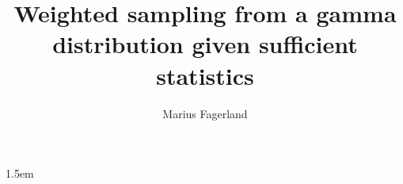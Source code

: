 \documentclass[a4paper,twoside,11pt]{memoir}
\begin{document}

	\title{Weighted sampling from a gamma distribution given sufficient statistics}
	\author{Marius Fagerland}
	
	\frontmatter
        
	\clearpage

	\pdfbookmark{\abstractname}{\abstractname}
	
	\clearpage

	\pdfbookmark{\contentsname}{\contentsname}
	\tableofcontents*
	\clearpage

	

	\mainmatter
	\setcounter{secnumdepth}{2}

	

	\appendix
	

	\backmatter
        \begingroup
        \emergencystretch 1.5em
	\printbibliography
        \endgroup
	\printindex
\end{document}
